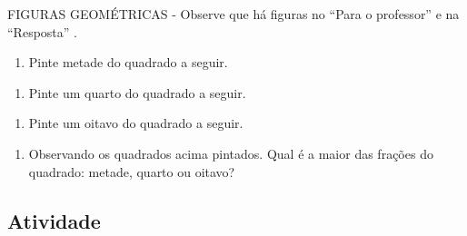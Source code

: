 \documentclass[a4,12pt]{book}
\begin{document}
\begin{imagem*}[breakable]{}{}   FIGURAS GEOMÉTRICAS - Observe que há figuras no   ``Para o professor''   e na   ``Resposta''  .  
\end{imagem*}

\begin{enumerate} [\quad a)] %
  \item     Pinte metade do quadrado a seguir.
\end{enumerate} %
\mbox{} \newline  %
\begin{enumerate} [\quad a)] %
  \item     Pinte um quarto do quadrado a seguir.
\end{enumerate} %
\mbox{} \newline  %
\begin{enumerate} [\quad a)] %
  \item     Pinte um oitavo do quadrado a seguir.
\end{enumerate} %
\mbox{} \newline  %
\begin{enumerate} [\quad a)] %
  \item     Observando os quadrados acima pintados. Qual é a maior das frações do quadrado: metade, quarto ou oitavo?
\end{enumerate} %






\subsection{Atividade}
\end{document}
